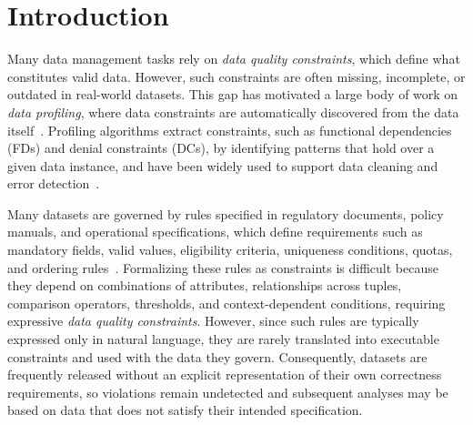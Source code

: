 \section{Introduction}
\label{sec:intro}

Many data management tasks rely on \emph{data quality constraints}, which define what constitutes valid data.
However, such constraints are often missing, incomplete, or outdated in real-world datasets. This gap has motivated a large body of work on \emph{data profiling}, where data constraints are automatically discovered from the data itself~\cite{profSurveyFelix2015}. 
Profiling algorithms extract constraints, such as functional dependencies (FDs) and denial constraints (DCs), by identifying patterns that hold over a given data instance, and have been widely used to support data cleaning and error detection~\cite{dependencyTree2020}.



Many datasets are governed by rules specified in regulatory documents, policy manuals, and operational specifications, which define requirements such as mandatory fields, valid values, eligibility criteria, uniqueness conditions, quotas, and ordering rules~\cite{batini2009methodologies,serra2024IQcontextDtaQuality,CABALLERO2022102058}. Formalizing these rules as constraints is difficult because they depend on combinations of attributes, relationships across tuples, comparison operators, thresholds, and context-dependent conditions, requiring expressive \emph{data quality constraints}. However, since such rules are typically expressed only in natural language, they are rarely translated into executable constraints and used with the data they govern. Consequently, datasets are frequently released without an explicit representation of their own correctness requirements, so violations remain undetected and subsequent analyses may be based on data that does not satisfy their intended specification.

